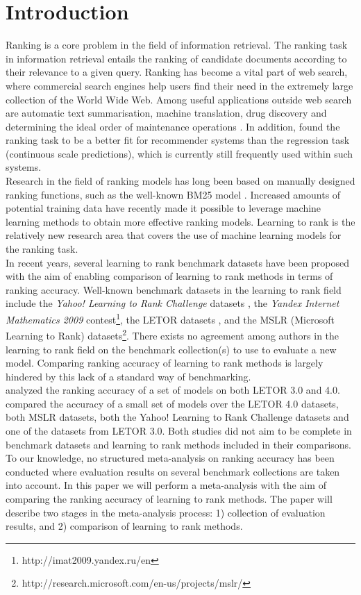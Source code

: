 \documentclass[english, authoryear, preprint]{elsarticle}
\begin{document}
\section{Introduction}
Ranking is a core problem in the field of information retrieval. The ranking task in information retrieval entails the ranking of candidate documents according to their relevance to a given query. Ranking has become a vital part of web search, where commercial search engines help users find their need in the extremely large collection of the World Wide Web. Among useful applications outside web search are automatic text summarisation, machine translation, drug discovery and determining the ideal order of maintenance operations \citep{Rudin2009}. In addition, \cite{McNee2006} found the ranking task to be a better fit for recommender systems than the regression task (continuous scale predictions), which is currently still frequently used within such systems.\\

Research in the field of ranking models has long been based on manually designed ranking functions, such as the well-known BM25 model \citep{Robertson1994}. Increased amounts of potential training data have recently made it possible to leverage machine learning methods to obtain more effective ranking models. Learning to rank is the relatively new research area that covers the use of machine learning models for the ranking task.\\

In recent years, several learning to rank benchmark datasets have been proposed with the aim of enabling comparison of learning to rank methods in terms of ranking accuracy. Well-known benchmark datasets in the learning to rank field include the \emph{Yahoo! Learning to Rank Challenge} datasets \citep{Chapelle2011a}, the \emph{Yandex Internet Mathematics 2009} contest\footnote{http://imat2009.yandex.ru/en}, the LETOR datasets \citep{Qin2010}, and the MSLR (Microsoft Learning to Rank) datasets\footnote{http://research.microsoft.com/en-us/projects/mslr/}. There exists no agreement among authors in the learning to rank field on the benchmark collection(s) to use to evaluate a new model. Comparing ranking accuracy of learning to rank methods is largely hindered by this lack of a standard way of benchmarking.\\

\cite{Gomes2013} analyzed the ranking accuracy of a set of models on both LETOR 3.0 and 4.0. \cite{Busa-Fekete2013} compared the accuracy of a small set of models over the LETOR 4.0 datasets, both MSLR datasets, both the Yahoo! Learning to Rank Challenge datasets and one of the datasets from LETOR 3.0. Both studies did not aim to be complete in benchmark datasets and learning to rank methods included in their comparisons. To our knowledge, no structured meta-analysis on ranking accuracy has been conducted where evaluation results on several benchmark collections are taken into account. In this paper we will perform a meta-analysis with the aim of comparing the ranking accuracy of learning to rank methods. The paper will describe two stages in the meta-analysis process: 1) collection of evaluation results, and 2) comparison of learning to rank methods.
\end{document}
